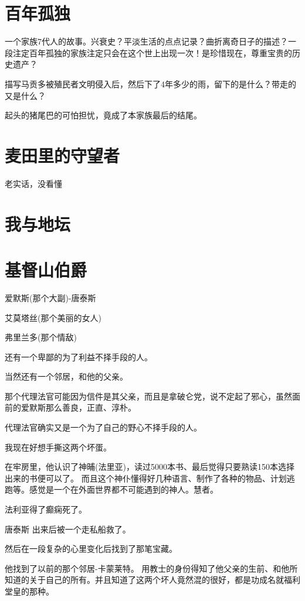 \documentclass[UTF8,a4paper,12pt]{ctexbook}
\begin{document}
	\section{百年孤独}
		一个家族7代人的故事。兴衰史？平淡生活的点点记录？曲折离奇日子的描述？一段注定百年孤独的家族注定只会在这个世上出现一次！是珍惜现在，尊重宝贵的历史遗产？
		
		描写马贡多被殖民者文明侵入后，然后下了4年多少的雨，留下的是什么？带走的又是什么？
		
		起头的猪尾巴的可怕担忧，竟成了本家族最后的结尾。
		
	\section{麦田里的守望者}
		老实话，没看懂
		
	\section{我与地坛}
	
	\section{基督山伯爵}
		爱默斯(那个大副)-唐泰斯
		
		艾莫塔丝(那个美丽的女人)
		
		弗里兰多(那个情敌)
		
		还有一个卑鄙的为了利益不择手段的人。
		
		当然还有一个邻居，和他的父亲。
		
		那个代理法官可能因为信件是其父亲，而且是拿破仑党，说不定起了邪心，虽然面前的爱默斯那么善良，正直、淳朴。
		
		代理法官确实又是一个为了自己的野心不择手段的人。
		
		我现在好想手撕这两个坏蛋。
		
		在牢房里，他认识了神晡(法里亚)，读过5000本书、最后觉得只要熟读150本选择出来的书便可以了。 而且这个神仆懂得好几种语言、制作了各种的物品、计划逃跑等。感觉是一个在外面世界都不可能遇到的神人。慧者。
		
		法利亚得了癫痫死了。
		
		唐泰斯 出来后被一个走私船救了。
		
		然后在一段复杂的心里变化后找到了那笔宝藏。
		
		
		他找到了以前的那个邻居-卡蒙莱特。 用教士的身份得知了他父亲的生前、和他所知道的关于自己的所有。并且知道了这两个坏人竟然混的很好，都是功成名就福利堂皇的那种。
		
\end{document}
